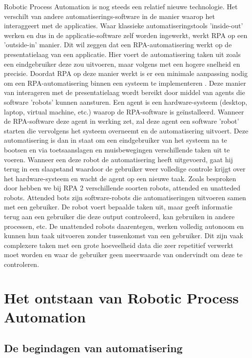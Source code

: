 Robotic Process Automation is nog steeds een relatief nieuwe technologie. Het verschilt van andere automatiserings-software in de manier waarop het interaggeert met de applicaties. Waar klassieke automatiseringstools 'inside-out' werken en dus in de applicatie-software zelf worden ingewerkt, werkt RPA op een 'outside-in' manier. Dit wil zeggen dat een RPA-automatisering werkt op de presentatielaag van een applicatie. 
Hier voert de automatisering taken uit zoals een eindgebruiker deze zou uitvoeren, maar volgens \textcite{Bras2023} met een hogere snelheid en precisie. Doordat RPA op deze manier werkt is er een minimale aanpassing nodig om een RPA-automatisering binnen een systeem te implementeren \autocite{Ivancic2019}.
Deze manier van interageren met de presentatielaag wordt bereikt door middel van agents die software 'robots' kunnen aansturen. Een agent is een hardware-systeem (desktop, laptop, virtual machine, etc.) waarop de RPA-software is geïnstalleerd. Wanneer de RPA-software deze agent in werking zet, zal deze agent een software 'robot' starten die vervolgens het systeem overneemt en de automatisering uitvoert. 
Deze automatisering is dan in staat om een eindgebruiker van het systeem na te bootsen en via toetsaanslagen en muisbewegingen verschillende taken uit te voeren. Wanneer een deze robot de automatisering heeft uitgevoerd, gaat hij terug in een slaapstand waardoor de gebruiker weer volledige controle krijgt over het hardware-systeem en wacht de agent op een nieuwe taak.
Zoals besproken door \textcite{Ivancic2019} hebben we bij RPA 2 verschillende soorten robots, attended en unatteded robots. Attended bots zijn software-robots die automatiseringen uitvoeren samen met een gebruiker. De robot voert bepaalde taken uit, maar geeft informatie terug aan een gebruiker die deze output controleerd, kan gebruiken in andere processen, etc. De unattended robots daarentegen, werken volledig autonoom en kunnen hun taak uitvoeren zonder tussenkomst van een gebruiker. 
Dit zijn vaak complexere taken met een grote hoeveelheid data die zeer repetitief verwerkt moet worden en waar de gebruiker geen meerwaarde van ondervindt om deze te controleren.

\section{Het ontstaan van Robotic Process Automation}

\subsection{De begindagen van automatisering}

